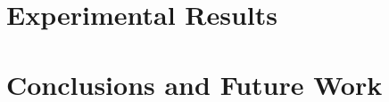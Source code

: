 \documentclass[letterpaper, 10pt, conference]{ieeeconf}
\begin{document}

\section{Experimental Results}
\label{ExpHover}


\section{Conclusions and Future Work}
\label{ConclusionFutureWork}
\end{document}
